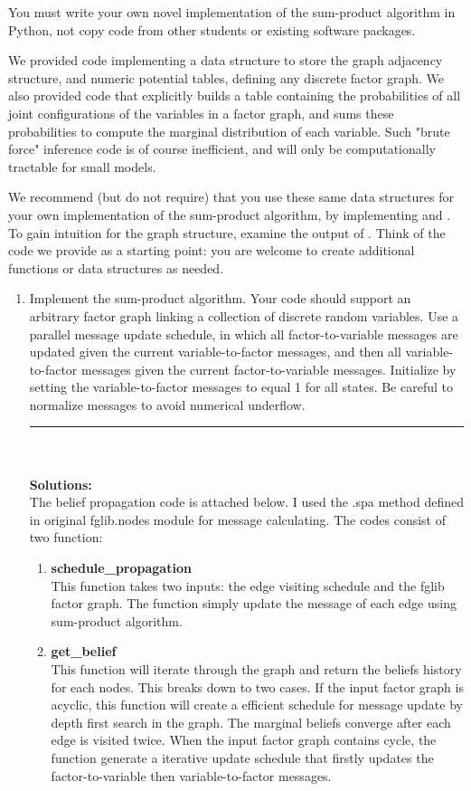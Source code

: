 \documentclass{article}
\begin{document}
\begin{enumerate}
You must write your own novel implementation of the sum-product algorithm in Python, not copy code from other students or existing software packages.

We  provided code implementing a data structure to store the graph adjacency structure, and numeric potential tables, defining any discrete factor graph. We also provided code that explicitly builds a table containing the probabilities of all joint configurations of the variables in a factor graph, and sums these probabilities to compute the marginal
distribution of each variable. Such "brute force" inference code is of course inefficient, and will only be computationally tractable for small models.

We recommend (but do not require) that you use these same data structures for your own implementation of the sum-product algorithm, by implementing 
and . To gain intuition for the graph structure, examine the output of . Think of the code we provide as a starting point: you are welcome to create additional functions or data structures as needed. 

\begin{enumerate}
\item Implement the sum-product algorithm. Your code should support an arbitrary factor graph linking a collection of discrete random variables. Use a parallel message update schedule,
in which all factor-to-variable messages are updated given the current variable-to-factor messages, and then all variable-to-factor messages given the current factor-to-variable
messages. Initialize by setting the variable-to-factor messages to equal 1 for all states.
Be careful to normalize messages to avoid numerical underflow.
\\
\noindent\rule{14cm}{2pt}
\\
\\
\textbf{Solutions:}
\\
The belief propagation code is attached below. I used the .spa method defined in original fglib.nodes module for message calculating. The codes consist of two function:
\begin{enumerate}
\item \textbf{schedule\_propagation}\\
This function takes two inputs: the edge visiting schedule and the fglib factor graph. The function simply update the message of each edge using sum-product algorithm.
\item \textbf{get\_belief}\\
This function will iterate through the graph and return the beliefs history for each nodes. This breaks down to two cases. If the input factor graph is acyclic, this function will create a efficient schedule for message update by depth first search in the graph. The marginal beliefs  converge after each edge is visited twice. When the input factor graph contains cycle, the function generate a iterative update schedule that firstly updates the factor-to-variable then variable-to-factor messages. 


\end{enumerate}
\end{enumerate}
\end{enumerate}
\end{document}
